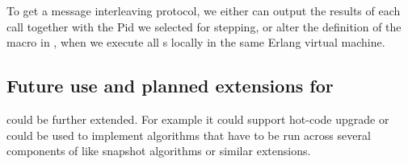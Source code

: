 
To get a message interleaving protocol, we either can output the results
of each  call together with the
Pid we selected for stepping, or alter the definition of the macro
 in , when we execute all
s locally in the same Erlang virtual machine.




\subsection{\texorpdfstring{Future use and planned extensions for }
             {Future use and planned extensions for gen\_component}}

 could be further extended. For example it could
support hot-code upgrade or could be used to implement algorithms that
have to be run across several components of \scalaris{} like snapshot
algorithms or similar extensions.





